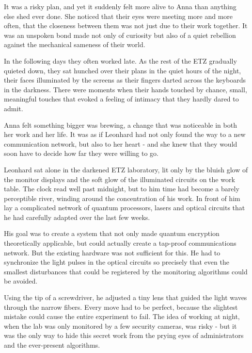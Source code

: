 \documentclass[
]{article}
\begin{document}
It was a risky plan, and yet it suddenly felt more alive to Anna than
anything else she\textquotesingle d ever done. She noticed that their
eyes were meeting more and more often, that the closeness between them
was not just due to their work together. It was an unspoken bond made
not only of curiosity but also of a quiet rebellion against the
mechanical sameness of their world.

In the following days they often worked late. As the rest of the ETZ
gradually quieted down, they sat hunched over their plans in the quiet
hours of the night, their faces illuminated by the screens as their
fingers darted across the keyboards in the darkness. There were moments
when their hands touched by chance, small, meaningful touches that
evoked a feeling of intimacy that they hardly dared to admit.

Anna felt something bigger was brewing, a change that was noticeable in
both her work and her life. It was as if Leonhard had not only found the
way to a new communication network, but also to her heart - and she knew
that they would soon have to decide how far they were willing to go.

Leonhard sat alone in the darkened ETZ laboratory, lit only by the
bluish glow of the monitor displays and the soft glow of the illuminated
circuits on the work table. The clock read well past midnight, but to
him time had become a barely perceptible river, winding around the
concentration of his work. In front of him lay a complicated network of
quantum processors, lasers and optical circuits that he had carefully
adapted over the last few weeks.

His goal was to create a system that not only made quantum encryption
theoretically applicable, but could actually create a tap-proof
communications network. But the existing hardware was not sufficient for
this. He had to synchronize the light pulses in the optical circuits so
precisely that even the smallest disturbances that could be registered
by the monitoring algorithms could be avoided.

Using the tip of a screwdriver, he adjusted a tiny lens that guided the
light waves through the narrow fibers. Every move had to be perfect,
because the slightest mistake could cause the entire experiment to fail.
The idea of \hspace{0pt}\hspace{0pt}working at night, when the lab was
only monitored by a few security cameras, was risky - but it was the
only way to hide this secret work from the prying eyes of administrators
and the ever-present algorithms.
\end{document}

